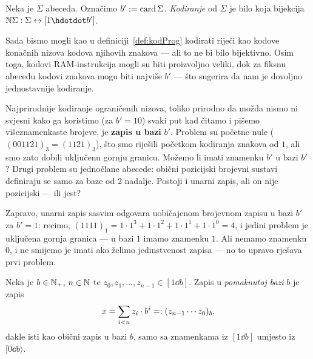 \begin{definicija}[{name=[kodiranje abecede]}]
Neka je $\Sigma$ abeceda. Označimo $b':=\operatorname{card}\Sigma$. %
\emph{Kodiranje} od $\Sigma$ je bilo koja bijekcija $\N\Sigma:\Sigma\leftrightarrow[1\dd b']$.
\end{definicija}


Sada bismo mogli kao u definiciji~\ref{def:kodProg} kodirati riječi kao kodove konačnih nizova kodova njihovih znakova --- ali to ne bi bilo bijektivno. Osim toga, kodovi RAM-instrukcija mogli su biti proizvoljno veliki, dok za fiksnu abecedu kodovi znakova mogu biti najviše $b'$ --- što sugerira da nam je dovoljno jednostavnije kodiranje.

Najprirodnije kodiranje ograničenih nizova, toliko prirodno da možda nismo ni svjesni kako ga koristimo (za $b'=10$) svaki put kad čitamo i pišemo višeznamenkaste brojeve, je \textbf{zapis u bazi} $b'$. Problem su početne nule ($(001121)_3=(1121)_3$), što smo riješili početkom kodiranja znakova od $1$, ali smo zato dobili uključenu gornju granicu. Možemo li imati znamenku $b'$ u bazi $b'$? Drugi problem su jednočlane abecede: obični pozicijski brojevni sustavi definiraju se samo za baze od $2$ nadalje. Postoji i unarni zapis, ali on nije pozicijski --- ili jest?

Zapravo, unarni zapis sasvim odgovara uobičajenom brojevnom zapisu u bazi $b'$ za $b'=1$: recimo, $(1111)_1=1\cdot1^3+1\cdot1^2+1\cdot1^1+1\cdot1^0=4$, i jedini problem je uključena gornja granica --- u bazi $1$ imamo znamenku $1$. Ali nemamo znamenku $0$, i ne smijemo je imati ako želimo jedinstvenost zapisa --- no to upravo rješava prvi problem.

\begin{definicija}[{name=[zapis broja u pomaknutoj bazi]}]
Neka je $b\in{\mathbb N}_+$, $n\in{\mathbb N}$ te $z_0,z_1,\dotsc,z_{n-1}\in[1\dd b]$. Zapis u \emph{pomaknutoj bazi} $b$ je zapis
\begin{equation}\label{eq:pomakbaza}
    x=\sum_{i<n}z_i\cdot b^i=:(z_{n-1}\dotsm z_0)_b\text,
\end{equation}
dakle isti kao obični zapis u bazi $b$, samo sa znamenkama iz $[1\dd b]$ umjesto iz $[0\dd b\rangle$.
\end{definicija}

